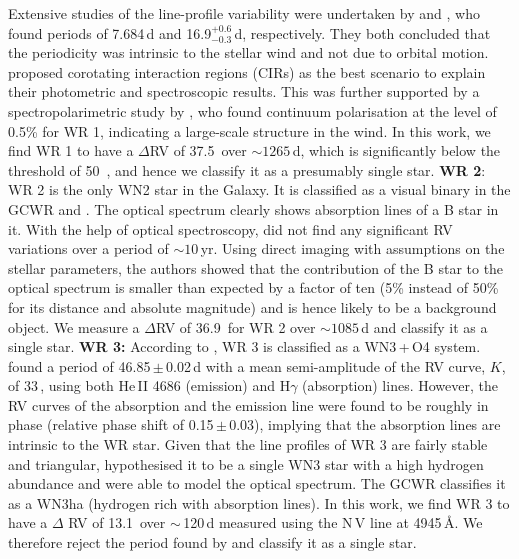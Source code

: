 Extensive studies of the line-profile variability were undertaken by \citet{2007Flores} and \citet{2010CheneStLouis}, who found periods of 7.684\,d and 16.9$^{+0.6}_{-0.3}$\,d, respectively. They both concluded that the periodicity was intrinsic to the stellar wind and not due to orbital motion. \citet{2010CheneStLouis} proposed corotating interaction regions (CIRs) as the best scenario to explain their photometric and spectroscopic results. This was further supported by a spectropolarimetric study by \citet{2013StLouis}, who found continuum polarisation at the level of 0.5\% for WR 1, indicating a large-scale structure in the wind. In this work, we find WR 1 to have a $\Delta$RV of 37.5\,\kms{} over ${\sim}1265$\,d, which is significantly below the threshold of 50\,\kms{} , and hence we classify it as a presumably single star.
\newline
\newline
\textbf{WR 2}: 
WR 2 is the only WN2 star in the Galaxy. It is classified as a visual binary in the GCWR and . The optical spectrum clearly shows absorption lines of a B star in it. With the help of optical spectroscopy, \citet{2019Chene} did not find any significant RV variations over a period of ${\sim}10$\,yr. Using direct imaging with assumptions on the stellar parameters, the authors showed that the contribution of the B star to the optical spectrum is smaller than expected by a factor of ten (5\% instead of 50\% for its distance and absolute magnitude) and is hence likely to be a background object. We measure a $\Delta$RV of 36.9\,\kms{} for WR 2 over ${\sim}1085$\,d and classify it as a single star. 
\newline
\newline
\textbf{WR 3:} According to , WR 3 is classified as a WN3\,+\,O4 system. \citet{1986Moffat+abs} found a period of 46.85\,$\pm$\,0.02\,d with a mean semi-amplitude of the RV curve, $K$, of 33\,\kms{}, using both He\,II 4686 (emission) and H$\gamma$ (absorption) lines. However, the RV curves of the absorption and the emission line were found to be roughly in phase (relative phase shift of 0.15\,$\pm$\,0.03), implying that the absorption lines are intrinsic to the WR star. Given that the line profiles of WR 3 are fairly stable and triangular, \citet{2004MarchenkoMoffatCrowtherWR3} hypothesised it to be a single WN3 star with a high hydrogen abundance and were able to model the optical spectrum. The GCWR classifies it as a WN3ha (hydrogen rich with absorption lines).  In this work, we find WR 3 to have a $\Delta$ RV of 13.1\,\kms{} over ${\sim}$\,120\,d measured using the N\,V line at 4945\,\r{A}. We therefore reject the period found by \citet{1986Moffat+abs} and classify it as a single star. 
